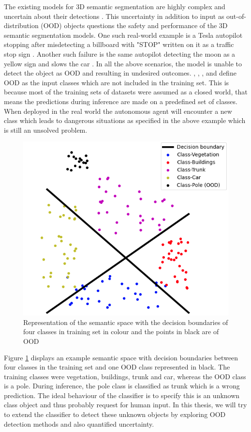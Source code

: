 \documentclass[thesis]{mas_proposal}
\begin{document}
The existing models for 3D semantic segmentation are highly complex and uncertain about their detections \cite{bhandary2020evaluating}. 
This uncertainty in addition to input as out-of-distribution (OOD) objects questions the safety and performance of the 3D semantic segmentation models.
One such real-world example is a Tesla autopilot stopping after misdetecting a billboard with "STOP" written on it as a traffic stop sign \cite{tesla_fails}. 
Another such failure is the same autopilot detecting the moon as a yellow sign and slows the car \cite{tesla_fails}.
In all the above scenarios, the model is unable to detect the object as OOD and resulting in undesired outcomes.
\cite{liang2017enhancing_ODIN}, \cite{bevandic2018discriminative}, \cite{Robinchan_2021_ICCV}, and \cite{angus2019_pixellevelOOD} define OOD as the input classes which
are not included in the training set. 
This is because most of the training sets of datasets were assumed as a closed world, that means the predictions during inference are made on a predefined set of classes. 
When deployed in the real world the autonomous agent will encounter a new class which leads to dangerous situations as specified in the above example which is still an unsolved problem.
\begin{figure}[h]
    \centering
    \includegraphics[scale=0.5]{images/OOD.png}
    \caption{Representation of the semantic space with the decision boundaries of four classes in training set in colour and the points in black are of OOD}
    \label{fig:semantic_space}
\end{figure}
Figure \ref{fig:semantic_space} displays an example semantic
space with decision boundaries between four classes in the training set and one OOD
class represented in black. The training classes were vegetation, buildings, trunk
and car, whereas the OOD class is a pole. During inference, the pole class is classified
as trunk which is a wrong prediction. The ideal behaviour of the classifier is to specify
this is an unknown class object and thus probably request for human input. In
this thesis, we will try to extend the classifier to detect these unknown objects by
exploring OOD detection methods and also quantified uncertainty.
\end{document}
